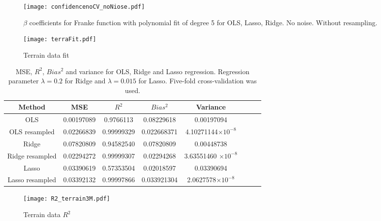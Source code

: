 \documentclass[10pt]{article}
\begin{document}
\begin{figure}
	\centerline{\texttt{[image: confidencenoCV\_noNiose.pdf]}}
	\label{plt:BetaNONoiseNoCV}
	\caption{$\beta$ coefficients for Franke function with polynomial fit of degree 5 for OLS, Lasso, Ridge. No noise. Without resampling.}
\end{figure}

\begin{figure}
	\centerline{\texttt{[image: terraFit.pdf]}}
	\caption{Terrain data fit}
\end{figure}

\begin{table}
	\begin{tabular}{ |c|c|c|c|c|c|c|c|} 
		\hline
		Method & MSE  & $R^2$ & $Bias^2$ & Variance    \\
		\hline 
		\hline  
		OLS & 0.00197089  & 0.9766113 & 0.08229618 & 0.00197094  \\
		\hline  
		OLS resampled & 0.02266839  & 0.99999329 & 0.022668371 & 4.10271144$\times 10^{-8}$  \\
		\hline
		Ridge & 0.07820809  &0.94582540& 0.07820809 &  0.00448738   \\ 
				\hline
		Ridge resampled & 0.02294272  & 0.99999307 & 0.02294268 & 3.63551460 $\times 10^{-8}$    \\ 
		\hline
		Lasso & 0.03390619  & 0.57353504 & 0.02018597 & 0.03390694    \\ 
		\hline
		Lasso resampled & 0.03392132  & 0.99997866 & 0.033921304 & 2.0627578$\times 10^{-8}$    \\ 
		\hline
	\end{tabular}
	\caption{MSE, $R^2$, $Bias^2$ and variance for OLS, Ridge and Lasso regression. Regression parameter $\lambda=0.2$ for Ridge and  $\lambda=0.015$  for Lasso. Five-fold cross-validation was used.} \label{tbl:one}
\end{table}



\begin{figure}
	\centerline{\texttt{[image: R2\_terrain3M.pdf]}}
	\caption{Terrain data $R^2$} \label{plt:R2Terra}
\end{figure}

\end{document}
